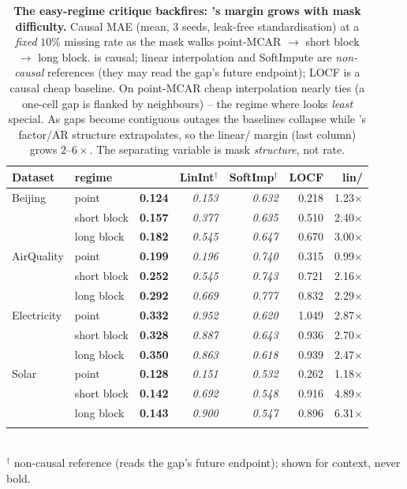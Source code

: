 \begin{table}[t]\centering\footnotesize
\setlength{\tabcolsep}{4pt}
\caption{\textbf{The easy-regime critique backfires: \cafe{}'s margin grows with mask difficulty.} Causal MAE (mean, 3 seeds, leak-free standardisation) at a \emph{fixed} $10\%$ missing rate as the mask walks point-MCAR $\to$ short block $\to$ long block. \cafe{} is causal; linear interpolation and SoftImpute are \emph{non-causal} references (they may read the gap's future endpoint); LOCF is a causal cheap baseline. On point-MCAR cheap interpolation nearly ties \cafe{} (a one-cell gap is flanked by neighbours) -- the regime where \cafe{} looks \emph{least} special. As gaps become contiguous outages the baselines collapse while \cafe{}'s factor/AR structure extrapolates, so the linear/\cafe{} margin (last column) grows $2$--$6\times$. The separating variable is mask \emph{structure}, not rate.}
\label{tab:regimeladder}
\begin{tabular}{@{}llrrrrr@{}}
\toprule
Dataset & regime & \cafe{} & LinInt$^{\dagger}$ & SoftImp$^{\dagger}$ & LOCF & lin/\cafe{} \\
\midrule
Beijing & point & \textbf{0.124} & \emph{0.153} & \emph{0.632} & 0.218 & 1.23$\times$ \\
 & short block & \textbf{0.157} & \emph{0.377} & \emph{0.635} & 0.510 & 2.40$\times$ \\
 & long block & \textbf{0.182} & \emph{0.545} & \emph{0.647} & 0.670 & 3.00$\times$ \\
\addlinespace[2pt]
AirQuality & point & \textbf{0.199} & \emph{0.196} & \emph{0.740} & 0.315 & 0.99$\times$ \\
 & short block & \textbf{0.252} & \emph{0.545} & \emph{0.743} & 0.721 & 2.16$\times$ \\
 & long block & \textbf{0.292} & \emph{0.669} & \emph{0.777} & 0.832 & 2.29$\times$ \\
\addlinespace[2pt]
Electricity & point & \textbf{0.332} & \emph{0.952} & \emph{0.620} & 1.049 & 2.87$\times$ \\
 & short block & \textbf{0.328} & \emph{0.887} & \emph{0.643} & 0.936 & 2.70$\times$ \\
 & long block & \textbf{0.350} & \emph{0.863} & \emph{0.618} & 0.939 & 2.47$\times$ \\
\addlinespace[2pt]
Solar & point & \textbf{0.128} & \emph{0.151} & \emph{0.532} & 0.262 & 1.18$\times$ \\
 & short block & \textbf{0.142} & \emph{0.692} & \emph{0.548} & 0.916 & 4.89$\times$ \\
 & long block & \textbf{0.143} & \emph{0.900} & \emph{0.547} & 0.896 & 6.31$\times$ \\
\addlinespace[2pt]
\bottomrule
\end{tabular}
\\[2pt]{\footnotesize $^{\dagger}$ non-causal reference (reads the gap's future endpoint); shown for context, never bold.}
\end{table}
